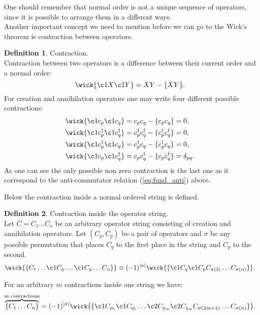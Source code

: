 \documentclass[twoside,english]{uiofysmaster}
\theoremstyle{definition}
\newtheorem{defn}{Definition}
\begin{document}
One should remember that normal order is not a unique sequence of operators, since it is possible to arrange them in a different ways.\\
Another important concept we need to mention before we can go to the Wick's theorem is contraction between operators.

\begin{defn} Contraction.\\
	Contraction between two operators is a difference between their current order and a normal order:
	\begin{equation}
	\wick{\c1 X \c1 Y}= XY - \{XY\}.
	\end{equation}
For creation and annihilation operators one may write four different possible contractions:
\begin{align}
\wick{\c1 c_p \c1 c_q} &=  c_p c_q -  \{c_p c_q\}=0,\\
\wick{\c1 c_p^\dagger \c1 c_q^\dagger}&=  c_p^\dagger c_q^\dagger -  \{c_p^\dagger c_q^\dagger\}=0,\\
\wick{\c1 c_p^\dagger \c1 c_q}&=  c_p^\dagger c_q-  \{c_p^\dagger c_q\}=0,\\
\wick{\c1 c_p \c1 c_q^\dagger}&=  c_p c_q^\dagger -  \{c_p c_q^\dagger\}=\delta_{pq}.
\end{align}
As one can see the only possible non zero contraction is the last one as it correspond to the anti-commutator relation (\ref{eq:fund_anti}) above.
\end{defn}
Below the contraction inside a normal ordered string is defined.
\begin{defn} Contraction inside the operator string.\\
	Let $ \bar{C}=C_1 \dots C_n $ be an arbitrary operator string consisting of creation and annihilation operators. Let $(C_q, C_p)$ be a pair of operators and $\sigma$ be any possible permutation that places $C_q$ to the first place in the string and
	 $C_p$ to the second.
\begin{equation}
	\wick{\{ C_1 \dots \c1 C_q  \dots \c1 C_p \dots C_n \} } \equiv (-1)^{\mid \sigma \mid} \wick{ \{  \c1 C_q  \c1 C_p C_{\sigma(3)} \dots C_{\sigma(n)} \} }.
\end{equation}
	
	For an arbitrary $m$ contractions inside one string we have:
\begin{equation}
	\overbrace{ \{ C_1 \dots C_n\} }^\text{m contractions}=(-1)^{\mid \sigma \mid} 
	\wick{\{ \c1 C_{p_1} \c1 C_{q_1} \dots \c2 C_{p_m} \c2 C_{q_m} C_{\sigma(2m+1)}\dots C_{\sigma(n)}  \} }.
\end{equation}
\end{defn}
\end{document}

